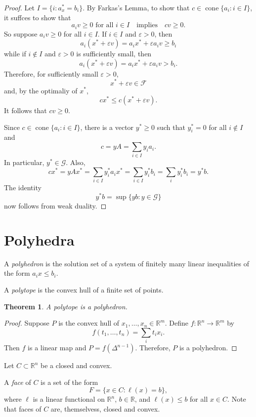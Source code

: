 \documentclass[12pt]{amsart}
\newtheorem{theorem}{Theorem}[section]
\theoremstyle{definition}
\theoremstyle{remark}
\numberwithin{equation}{section}
\renewcommand{\epsilon}{\varepsilon}
\newcommand{\RR}{\mathbb{R}}
\newcommand{\cF}{\mathcal{F}}
\newcommand{\cG}{\mathcal{G}}
\DeclareMathOperator{\cone}{cone}
\begin{document}
\begin{proof}
    Let $I=\{i : a_x^*=b_i\}$.
    By Farkas's Lemma, to show that $c\in\cone\{a_i: i\in I\}$, it suffces to show that
    \[
        \text{$a_iv\geq 0$ for all $i\in I$}\quad\text{implies}\quad cv\geq 0.
    \]
    So suppose $a_iv\geq 0$ for all $i\in I$.
    If $i\in I$ and $\epsilon > 0$, then
    \[
        a_i(x^* + \epsilon v) = a_ix^* + \epsilon a_iv \geq b_i
    \]
    while if $i\notin I$ and $\epsilon > 0$ is sufficiently small, then
    \[
        a_i(x^* + \epsilon v) = a_ix^* + \epsilon a_iv > b_i.
    \]
    Therefore, for sufficiently small $\epsilon > 0$,
    \[
        x^* + \epsilon v\in\cF
    \]
    and, by the optimaliy of $x^*$,
    \[
        cx^* \leq c(x^* + \epsilon v).
    \]
    It follows that $cv\geq 0$.

    Since $c\in\cone\{a_i : i \in I\}$, there is a vector
    $y^*\geq 0$ such that $y_i^*=0$ for all $i\notin I$ and
    \[
        c = yA = \sum_{i\in I}y_ia_i.
    \]
    In particular, $y^*\in\cG$.
    Also,
    \[
        cx^* = yAx^* = \sum_{i\in I} y_i^*a_ix^*
        = \sum_{i\in I} y_i^*b_i = \sum_i y_i^*b_i = y^*b.
    \]
    The identity
    \[
        y^*b = \sup\{yb:y\in\cG\}
    \]
    now follows from weak duality.
\end{proof}

\section{Polyhedra}

A \emph{polyhedron} is the solution set of a system of finitely many
linear inequalities of the form $a_ix\leq b_i$.

A \emph{polytope} is the convex hull of a finite set of points.

\begin{theorem}
    A polytope is a polyhedron.
\end{theorem}
\begin{proof}
    Suppose $P$ is the convex hull of $x_1,\ldots,x_n\in\RR^m$.
    Define $f:\RR^n\to\RR^m$ by
    \[
        f(t_1,\ldots,t_n) = \sum_i t_ix_i.
    \]
    Then $f$ is a linear map and $P=f(\Delta^{n-1})$.
    Therefore, $P$ is a polyhedron.
\end{proof}

Let $C\subset\RR^{n}$ be a closed and convex.

A \emph{face} of $C$ is a set of the form
\[
    F = \{x\in C : \ell(x)=b\},
\]
where $\ell$ is a linear functional on $\RR^n$, $b\in\RR$,
and $\ell(x)\leq b$ for all $x\in C$.
Note that faces of $C$ are, themselvess, closed and convex.
\end{document}
